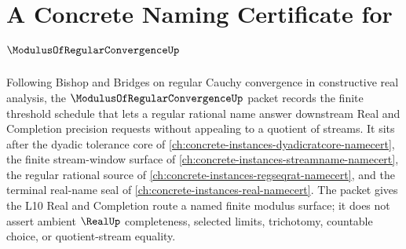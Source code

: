\chapter{A Concrete Naming Certificate for $\ModulusOfRegularConvergenceUp$}
\label{ch:concrete-instances-modulus-of-regular-convergence-namecert}

Following Bishop and Bridges on regular Cauchy convergence in constructive real analysis, the $\ModulusOfRegularConvergenceUp$ packet records the finite threshold schedule that lets a regular rational name answer downstream Real and Completion precision requests without appealing to a quotient of streams. It sits after the dyadic tolerance core of \autoref{ch:concrete-instances-dyadicratcore-namecert}, the finite stream-window surface of \autoref{ch:concrete-instances-streamname-namecert}, the regular rational source of \autoref{ch:concrete-instances-regseqrat-namecert}, and the terminal real-name seal of \autoref{ch:concrete-instances-real-namecert}. The packet gives the L10 Real and Completion route a named finite modulus surface; it does not assert ambient $\RealUp$ completeness, selected limits, trichotomy, countable choice, or quotient-stream equality.

